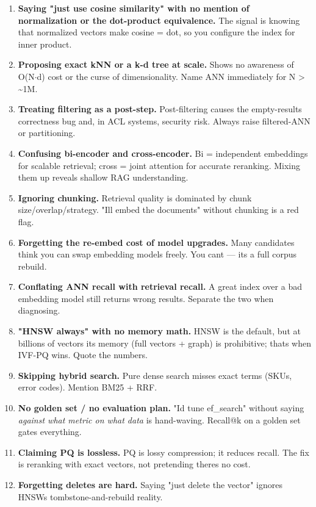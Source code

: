 \documentclass[11pt]{article}
\begin{document}
\begin{enumerate}
\def\labelenumi{\arabic{enumi}.}
\item
  \textbf{Saying "just use cosine similarity" with no mention of normalization or the dot-product equivalence.} The signal is knowing that normalized vectors make cosine = dot, so you configure the index for inner product.
\item
  \textbf{Proposing exact kNN or a k-d tree at scale.} Shows no awareness of O(N\(\cdot\)d) cost or the curse of dimensionality. Name ANN immediately for N \textgreater{} \textasciitilde1M.
\item
  \textbf{Treating filtering as a post-step.} Post-filtering causes the empty-results correctness bug and, in ACL systems, security risk. Always raise filtered-ANN or partitioning.
\item
  \textbf{Confusing bi-encoder and cross-encoder.} Bi = independent embeddings for scalable retrieval; cross = joint attention for accurate reranking. Mixing them up reveals shallow RAG understanding.
\item
  \textbf{Ignoring chunking.} Retrieval quality is dominated by chunk size/overlap/strategy. "I\textquotesingle ll embed the documents" without chunking is a red flag.
\item
  \textbf{Forgetting the re-embed cost of model upgrades.} Many candidates think you can swap embedding models freely. You can\textquotesingle t --- it\textquotesingle s a full corpus rebuild.
\item
  \textbf{Conflating ANN recall with retrieval recall.} A great index over a bad embedding model still returns wrong results. Separate the two when diagnosing.
\item
  \textbf{"HNSW always" with no memory math.} HNSW is the default, but at billions of vectors its memory (full vectors + graph) is prohibitive; that\textquotesingle s when IVF-PQ wins. Quote the numbers.
\item
  \textbf{Skipping hybrid search.} Pure dense search misses exact terms (SKUs, error codes). Mention BM25 + RRF.
\item
  \textbf{No golden set / no evaluation plan.} "I\textquotesingle d tune ef\_search" without saying \emph{against what metric on what data} is hand-waving. Recall@k on a golden set gates everything.
\item
  \textbf{Claiming PQ is lossless.} PQ is lossy compression; it reduces recall. The fix is reranking with exact vectors, not pretending there\textquotesingle s no cost.
\item
  \textbf{Forgetting deletes are hard.} Saying "just delete the vector" ignores HNSW\textquotesingle s tombstone-and-rebuild reality.
\end{enumerate}
\end{document}
